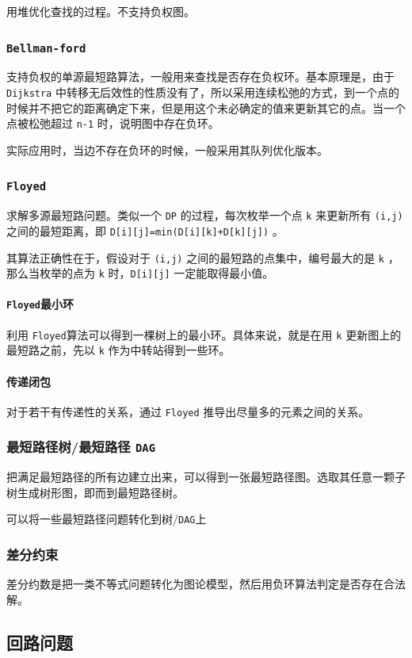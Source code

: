 \documentclass[UTF-8]{ctexart}
\begin{document}
	用堆优化查找的过程。不支持负权图。
	\subsubsection{\texttt{Bellman-ford}}
	支持负权的单源最短路算法，一般用来查找是否存在负权环。基本原理是，由于 \texttt{Dijkstra} 中转移无后效性的性质没有了，所以采用连续松弛的方式，到一个点的时候并不把它的距离确定下来，但是用这个未必确定的值来更新其它的点。当一个点被松弛超过 \texttt{n-1} 时，说明图中存在负环。
	
	实际应用时，当边不存在负环的时候，一般采用其队列优化版本。
	\subsubsection{\texttt{Floyed}}
	求解多源最短路问题。类似一个 \texttt{DP} 的过程，每次枚举一个点 \texttt{k} 来更新所有 \texttt{(i,j)} 之间的最短距离，即 \texttt{D[i][j]=min(D[i][k]+D[k][j])} 。
	
	其算法正确性在于，假设对于 \texttt{(i,j)} 之间的最短路的点集中，编号最大的是 \texttt{k} ，那么当枚举的点为 \texttt{k} 时，\texttt{D[i][j]} 一定能取得最小值。
	
	\paragraph{\texttt{Floyed}最小环} 利用 \texttt{Floyed}算法可以得到一棵树上的最小环。具体来说，就是在用 \texttt{k} 更新图上的最短路之前，先以 \texttt{k} 作为中转站得到一些环。
	\paragraph{传递闭包} 对于若干有传递性的关系，通过 \texttt{Floyed} 推导出尽量多的元素之间的关系。
	\subsubsection{最短路径树/最短路径 \texttt{DAG}}
	把满足最短路径的所有边建立出来，可以得到一张最短路径图。选取其任意一颗子树生成树形图，即而到最短路径树。
	
	可以将一些最短路径问题转化到树/\texttt{DAG}上
	\subsubsection{差分约束}
	差分约数是把一类不等式问题转化为图论模型，然后用负环算法判定是否存在合法解。
	\subsection{回路问题}
\end{document}

